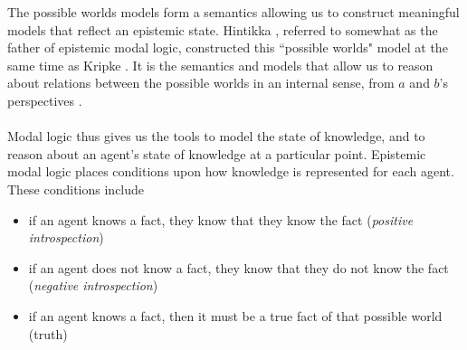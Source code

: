 The possible worlds models form a semantics allowing us to construct meaningful
models that reflect an epistemic state.
Hintikka \cite{hintikka1962knowledge}, referred to somewhat as the father of epistemic modal logic,
constructed this ``possible worlds" model at the same time as Kripke \cite{MALQ:MALQ19630090502}.
It is the semantics and models that allow us to reason about relations between the possible worlds in
an internal sense, from $a$ and $b$'s perspectives \cite{blackburn2002modal}.\\
\\
Modal logic thus gives us the tools to model the state of knowledge, and to reason about an agent's
state of knowledge at a particular point.
Epistemic modal logic places conditions upon how knowledge is represented for each agent.
These conditions include
\begin{itemize}
	\item if an agent knows a fact, they know that they know the fact ({\em positive introspection})
	\item if an agent does not know a fact, they know that they do not know the fact ({\em negative
		introspection})
	\item if an agent knows a fact, then it must be a true fact of that possible world (truth)
\end{itemize}

